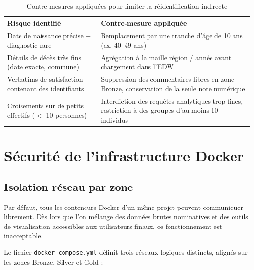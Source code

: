 \documentclass[12pt, a4paper]{report}
\begin{document}
\begin{itemize}[label=\textcolor{chuBlue}{\textbullet}]
\begin{table}[htbp]
\centering\footnotesize\renewcommand{\arraystretch}{1.5}
\begin{tabularx}{\linewidth}{@{} L{5.0cm} X @{}}
\toprule
{}
\textbf{Risque identifié} & \textbf{Contre-mesure appliquée} \\
\midrule
Date de naissance précise + diagnostic rare &
Remplacement par une tranche d'âge de 10 ans (ex. 40--49 ans) \\
Détails de décès très fins (date exacte, commune) &
Agrégation à la maille région / année avant chargement dans l'EDW \\
Verbatims de satisfaction contenant des identifiants &
Suppression des commentaires libres en zone Bronze, conservation de la seule note numérique \\
Croisements sur de petits effectifs ($<$ 10 personnes) &
Interdiction des requêtes analytiques trop fines, restriction à des groupes d'au moins 10 individus \\
\bottomrule
\end{tabularx}
\caption{Contre-mesures appliquées pour limiter la réidentification indirecte}
\label{tab:reidentification}
\end{table}

\clearpage

\section{Sécurité de l'infrastructure Docker}

\subsection{Isolation réseau par zone}

Par défaut, tous les conteneurs Docker d'un même projet peuvent communiquer librement. Dès lors que l'on mélange des données brutes nominatives et des outils de visualisation accessibles aux utilisateurs finaux, ce fonctionnement est inacceptable.

Le fichier \texttt{docker-compose.yml} définit trois réseaux logiques distincts, alignés sur les zones Bronze, Silver et Gold :


\end{itemize}
\end{document}
